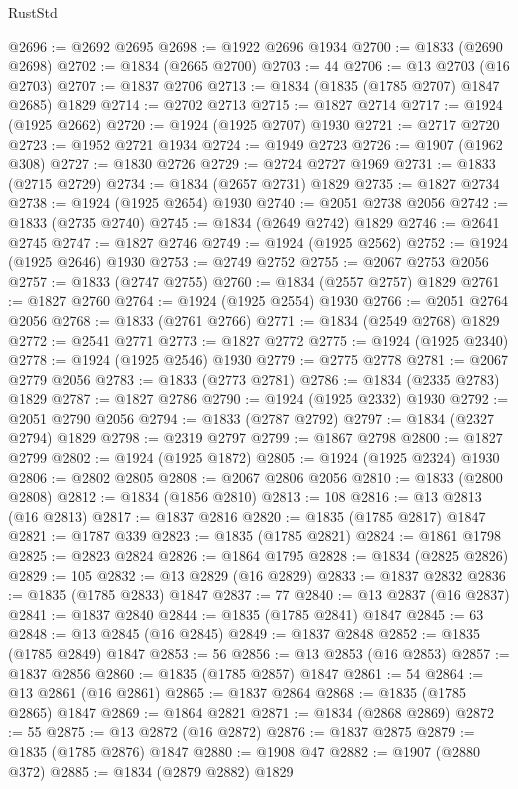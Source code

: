 \begin{lexlean}{RustStd}
\begin{coremodule}
@2696 := @2692 @2695
@2698 := @1922 @2696 @1934
@2700 := @1833 (@2690 @2698)
@2702 := @1834 (@2665 @2700)
@2703 := 44
@2706 := @13 @2703 (@16 @2703)
@2707 := @1837 @2706
@2713 := @1834 (@1835 (@1785 @2707) @1847 @2685) @1829
@2714 := @2702 @2713
@2715 := @1827 @2714
@2717 := @1924 (@1925 @2662)
@2720 := @1924 (@1925 @2707) @1930
@2721 := @2717 @2720
@2723 := @1952 @2721 @1934
@2724 := @1949 @2723
@2726 := @1907 (@1962 @308)
@2727 := @1830 @2726
@2729 := @2724 @2727 @1969
@2731 := @1833 (@2715 @2729)
@2734 := @1834 (@2657 @2731) @1829
@2735 := @1827 @2734
@2738 := @1924 (@1925 @2654) @1930
@2740 := @2051 @2738 @2056
@2742 := @1833 (@2735 @2740)
@2745 := @1834 (@2649 @2742) @1829
@2746 := @2641 @2745
@2747 := @1827 @2746
@2749 := @1924 (@1925 @2562)
@2752 := @1924 (@1925 @2646) @1930
@2753 := @2749 @2752
@2755 := @2067 @2753 @2056
@2757 := @1833 (@2747 @2755)
@2760 := @1834 (@2557 @2757) @1829
@2761 := @1827 @2760
@2764 := @1924 (@1925 @2554) @1930
@2766 := @2051 @2764 @2056
@2768 := @1833 (@2761 @2766)
@2771 := @1834 (@2549 @2768) @1829
@2772 := @2541 @2771
@2773 := @1827 @2772
@2775 := @1924 (@1925 @2340)
@2778 := @1924 (@1925 @2546) @1930
@2779 := @2775 @2778
@2781 := @2067 @2779 @2056
@2783 := @1833 (@2773 @2781)
@2786 := @1834 (@2335 @2783) @1829
@2787 := @1827 @2786
@2790 := @1924 (@1925 @2332) @1930
@2792 := @2051 @2790 @2056
@2794 := @1833 (@2787 @2792)
@2797 := @1834 (@2327 @2794) @1829
@2798 := @2319 @2797
@2799 := @1867 @2798
@2800 := @1827 @2799
@2802 := @1924 (@1925 @1872)
@2805 := @1924 (@1925 @2324) @1930
@2806 := @2802 @2805
@2808 := @2067 @2806 @2056
@2810 := @1833 (@2800 @2808)
@2812 := @1834 (@1856 @2810)
@2813 := 108
@2816 := @13 @2813 (@16 @2813)
@2817 := @1837 @2816
@2820 := @1835 (@1785 @2817) @1847
@2821 := @1787 @339
@2823 := @1835 (@1785 @2821)
@2824 := @1861 @1798
@2825 := @2823 @2824
@2826 := @1864 @1795
@2828 := @1834 (@2825 @2826)
@2829 := 105
@2832 := @13 @2829 (@16 @2829)
@2833 := @1837 @2832
@2836 := @1835 (@1785 @2833) @1847
@2837 := 77
@2840 := @13 @2837 (@16 @2837)
@2841 := @1837 @2840
@2844 := @1835 (@1785 @2841) @1847
@2845 := 63
@2848 := @13 @2845 (@16 @2845)
@2849 := @1837 @2848
@2852 := @1835 (@1785 @2849) @1847
@2853 := 56
@2856 := @13 @2853 (@16 @2853)
@2857 := @1837 @2856
@2860 := @1835 (@1785 @2857) @1847
@2861 := 54
@2864 := @13 @2861 (@16 @2861)
@2865 := @1837 @2864
@2868 := @1835 (@1785 @2865) @1847
@2869 := @1864 @2821
@2871 := @1834 (@2868 @2869)
@2872 := 55
@2875 := @13 @2872 (@16 @2872)
@2876 := @1837 @2875
@2879 := @1835 (@1785 @2876) @1847
@2880 := @1908 @47
@2882 := @1907 (@2880 @372)
@2885 := @1834 (@2879 @2882) @1829

\end{coremodule}
\end{lexlean}
